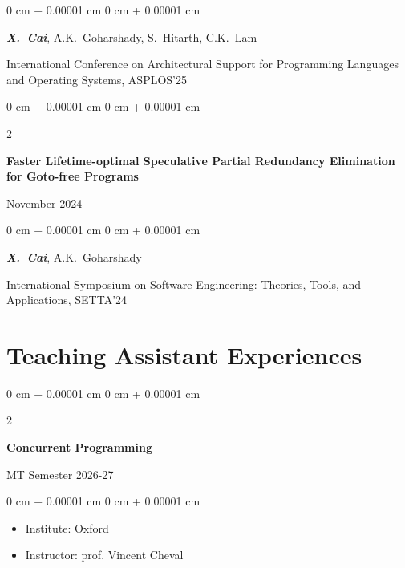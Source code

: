 \documentclass[10pt, letterpaper]{article}
\newenvironment{highlights}{
    \begin{itemize}[
        topsep=0.10 cm,
        parsep=0.10 cm,
        partopsep=0pt,
        itemsep=0pt,
        leftmargin=0 cm + 10pt
    ]
}{
    \end{itemize}
} %
\newenvironment{onecolentry}{
    \begin{adjustwidth}{
        0 cm + 0.00001 cm
    }{
        0 cm + 0.00001 cm
    }
}{
    \end{adjustwidth}
} %
\newenvironment{twocolentry}[2][]{
    \onecolentry
    \def\secondColumn{#2}
    \setcolumnwidth{\fill, 4.5 cm}
    \begin{paracol}{2}
}{
    \switchcolumn \raggedleft \secondColumn
    \end{paracol}
    \endonecolentry
} %
\begin{document}
\begin{samepage}
            \vspace{0.10 cm}
            
            \begin{onecolentry}
                \mbox{\textbf{\textit{X. Cai}}}, 
                \mbox{A.K. Goharshady},
                \mbox{S. Hitarth},
                \mbox{C.K. Lam}
                \vspace{0.10 cm}
            
        International Conference on Architectural Support for Programming Languages and Operating Systems, ASPLOS'25
        \end{onecolentry}
        \vspace{0.2 cm}
         \begin{twocolentry}{
                November 2024
            }
                \textbf{Faster Lifetime-optimal Speculative Partial Redundancy Elimination for Goto-free Programs}
            \end{twocolentry}

            \vspace{0.10 cm}
            
            \begin{onecolentry}
                \mbox{\textbf{\textit{X. Cai}}}, 
                \mbox{A.K. Goharshady}
                \vspace{0.10 cm}
            
        International Symposium on Software Engineering: Theories, Tools, and Applications, SETTA'24
        \end{onecolentry}
        \end{samepage}

    \section{Teaching Assistant Experiences}
        \begin{twocolentry}{
                MT Semester 2026-27
            }
                \textbf{Concurrent Programming}
            \end{twocolentry}
            \vspace{0.10 cm}
            \begin{onecolentry}
            \begin{highlights}
                \item Institute: Oxford
                \item Instructor: prof. Vincent Cheval
            \end{highlights}
        \end{onecolentry}
\end{document}
